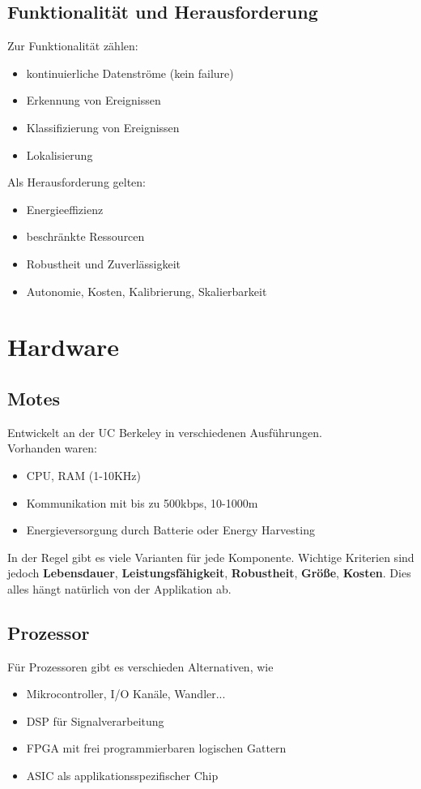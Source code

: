\documentclass[a4paper]{article}
\begin{document}
\subsection{Funktionalität und Herausforderung}
Zur Funktionalität zählen:
\begin{itemize}
	\item kontinuierliche Datenströme (kein failure)
	\item Erkennung von Ereignissen
	\item Klassifizierung von Ereignissen
	\item Lokalisierung
\end{itemize}
Als Herausforderung gelten:
\begin{itemize}
	\item Energieeffizienz
	\item beschränkte Ressourcen
	\item Robustheit und Zuverlässigkeit
	\item Autonomie, Kosten, Kalibrierung, Skalierbarkeit
\end{itemize}
\newpage
\section{Hardware}
\subsection{Motes}
Entwickelt an der UC Berkeley in verschiedenen Ausführungen.\\
Vorhanden waren:
\begin{itemize}
	\item CPU, RAM (1-10KHz)
	\item Kommunikation mit bis zu 500kbps, 10-1000m
	\item Energieversorgung durch Batterie oder Energy Harvesting
\end{itemize}
In der Regel gibt es viele Varianten für jede Komponente. Wichtige Kriterien sind jedoch \textbf{Lebensdauer}, \textbf{Leistungsfähigkeit}, \textbf{Robustheit}, \textbf{Größe}, \textbf{Kosten}. Dies alles hängt natürlich von der Applikation ab.\\

\subsection{Prozessor}
Für Prozessoren gibt es verschieden Alternativen, wie 
\begin{itemize}
	\item Mikrocontroller, I/O Kanäle, Wandler...
	\item DSP für Signalverarbeitung
	\item FPGA mit frei programmierbaren logischen Gattern
	\item ASIC als applikationsspezifischer Chip
\end{itemize}
\end{document}
